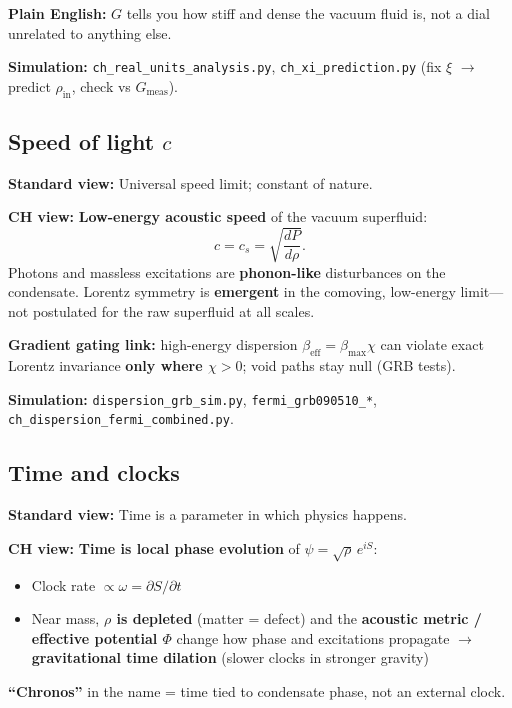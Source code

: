 \documentclass[11pt,a4paper]{article}
\begin{document}
\textbf{Plain English:} $G$ tells you how stiff and dense the vacuum fluid is, not a dial unrelated to anything else.

\textbf{Simulation:} \texttt{ch\_real\_units\_analysis.py}, \texttt{ch\_xi\_prediction.py} (fix $\xi$ $\to$ predict $\rho_{\mathrm{in}}$, check vs $G_{\mathrm{meas}}$).

\subsection{Speed of light $c$}

\textbf{Standard view:} Universal speed limit; constant of nature.

\textbf{CH view:} \textbf{Low-energy acoustic speed} of the vacuum superfluid:
\begin{equation}
  c = c_s = \sqrt{\frac{dP}{d\rho}}.
\end{equation}
Photons and massless excitations are \textbf{phonon-like} disturbances on the condensate.
Lorentz symmetry is \textbf{emergent} in the comoving, low-energy limit---not postulated for the raw superfluid at all scales.

\textbf{Gradient gating link:} high-energy dispersion $\beta_{\mathrm{eff}} = \beta_{\max}\chi$ can violate exact Lorentz invariance \textbf{only where $\chi > 0$}; void paths stay null (GRB tests).

\textbf{Simulation:} \texttt{dispersion\_grb\_sim.py}, \texttt{fermi\_grb090510\_*}, \texttt{ch\_dispersion\_fermi\_combined.py}.

\subsection{Time and clocks}

\textbf{Standard view:} Time is a parameter in which physics happens.

\textbf{CH view:} \textbf{Time is local phase evolution} of $\psi = \sqrt{\rho}\,e^{iS}$:
\begin{itemize}[leftmargin=*]
  \item Clock rate $\propto \omega = \partial S/\partial t$
  \item Near mass, \textbf{$\rho$ is depleted} (matter = defect) and the \textbf{acoustic metric / effective potential $\Phi$} change how phase and excitations propagate $\to$ \textbf{gravitational time dilation} (slower clocks in stronger gravity)
\end{itemize}

\textbf{``Chronos''} in the name = time tied to condensate phase, not an external clock.
\end{document}
